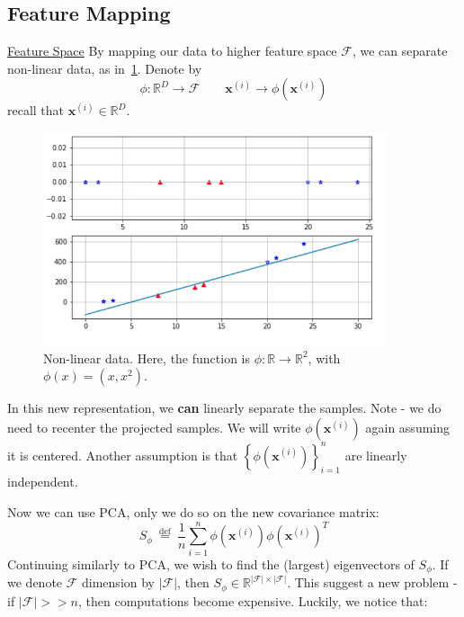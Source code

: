 \documentclass{article}
\begin{document}
\subsection{Feature Mapping}\label{ssec:featureMapping}
\ul{Feature Space} By mapping our data to higher feature space $\mathcal{F}$, we can separate non-linear data, as in~\cref{fig:nonLinearData}.  Denote by
\[
  \phi: \mathbb{R}^{D} \to \mathcal{F} \qquad \bm{x}^{(i)} \to \phi(\bm{x}^{(i)})
\]
recall that $\bm{x}^{(i)} \in \mathbb{R}^{D}$.
\begin{figure}[H] \centering \includegraphics[height=0.3\textheight,width=0.9\textwidth,keepaspectratio]{nonLinearData} \caption{Non-linear data. Here, the function is $\phi : \mathbb{R} \to \mathbb{R}^{2}$, with $\phi(x)=(x, x^2)$. } \label{fig:nonLinearData} \end{figure}
  In this new representation, we \textbf{can} linearly separate the samples. Note - we do need to recenter the projected samples. We will write $\phi(\bm{x}^{(i)})$ again assuming it is centered. Another assumption is that $\left\{ \phi(\bm{x}^{(i)}) \right\}_{i=1}^{n}$ are linearly independent. 

Now we can use PCA, only we do so on the new covariance matrix:
\[
  S_{\phi} \stackrel{\text{ def }}{=} \frac{1}{n} \sum_{i=1}^{n} \phi(\bm{x}^{(i)}) \phi( \bm{x}^{(i)})^T
\]
Continuing similarly to PCA, we wish to find the (largest) eigenvectors of $S_{\phi}$. 
If we denote $\mathcal{F}$ dimension by $|\mathcal{F}|$, then $S_{\phi} \in \mathbb{R}^{|\mathcal{F}| \times  |\mathcal{F}|}$. 
This suggest a new problem - if $|\mathcal{F}| >> n$, then computations become expensive. Luckily, we notice that:
\end{document}

